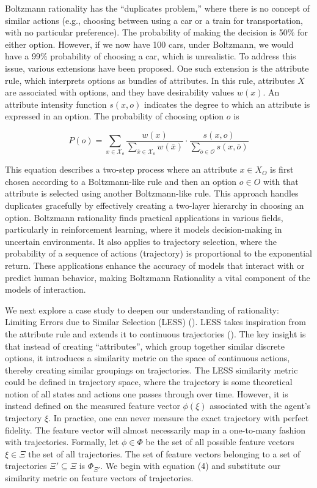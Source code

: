 \documentclass[
  letterpaper,
  numbers=noenddot,
  DIV=11]{scrreprt}
\theoremstyle{definition}
\theoremstyle{plain}
\theoremstyle{plain}
\theoremstyle{remark}
\begin{document}
Boltzmann rationality has the ``duplicates problem,'' where there is no
concept of similar actions (e.g., choosing between using a car or a
train for transportation, with no particular preference). The
probability of making the decision is 50\% for either option. However,
if we now have 100 cars, under Boltzmann, we would have a 99\%
probability of choosing a car, which is unrealistic. To address this
issue, various extensions have been proposed. One such extension is the
attribute rule, which interprets options as bundles of attributes. In
this rule, attributes \(X\) are associated with options, and they have
desirability values \(w(x)\). An attribute intensity function
\(s(x, o)\) indicates the degree to which an attribute is expressed in
an option. The probability of choosing option \(o\) is

\[P(o) = \sum_{x \in \mathcal{X}_o} \frac{w(x)}{\sum_{\bar{x} \in \mathcal{X}_o} w(\bar{x})} \cdot \frac{s(x, o)}{\sum_{\tilde{o} \in \mathcal{O}} s(x, \bar{o})}\]

This equation describes a two-step process where an attribute
\(x \in X_O\) is first chosen according to a Boltzmann-like rule and
then an option \(o \in O\) with that attribute is selected using another
Boltzmann-like rule. This approach handles duplicates gracefully by
effectively creating a two-layer hierarchy in choosing an option.
Boltzmann rationality finds practical applications in various fields,
particularly in reinforcement learning, where it models decision-making
in uncertain environments. It also applies to trajectory selection,
where the probability of a sequence of actions (trajectory) is
proportional to the exponential return. These applications enhance the
accuracy of models that interact with or predict human behavior, making
Boltzmann Rationality a vital component of the models of interaction.

We next explore a case study to deepen our understanding of rationality:
Limiting Errors due to Similar Selection (LESS)
(). LESS takes inspiration
from the attribute rule and extends it to continuous trajectories
(). The key insight is that
instead of creating ``attributes'', which group together similar
discrete options, it introduces a similarity metric on the space of
continuous actions, thereby creating similar groupings on trajectories.
The LESS similarity metric could be defined in trajectory space, where
the trajectory is some theoretical notion of all states and actions one
passes through over time. However, it is instead defined on the measured
feature vector \(\phi(\xi)\) associated with the agent's trajectory
\(\xi\). In practice, one can never measure the exact trajectory with
perfect fidelity. The feature vector will almost necessarily map in a
one-to-many fashion with trajectories. Formally, let \(\phi \in \Phi\)
be the set of all possible feature vectors \(\xi \in \Xi\) the set of
all trajectories. The set of feature vectors belonging to a set of
trajectories \(\Xi' \subseteq \Xi\) is \(\Phi_{\Xi'}\). We begin with
equation (4) and substitute our similarity metric on feature vectors of
trajectories.
\end{document}
